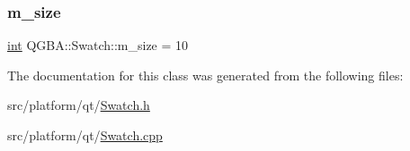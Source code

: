 \subsubsection{\texorpdfstring{m\+\_\+size}{m\_size}}
{\footnotesize\ttfamily \mbox{\hyperlink{ioapi_8h_a787fa3cf048117ba7123753c1e74fcd6}{int}} Q\+G\+B\+A\+::\+Swatch\+::m\+\_\+size = 10\hspace{0.3cm}{\ttfamily [private]}}



The documentation for this class was generated from the following files\+:\begin{DoxyCompactItemize}
\item 
src/platform/qt/\mbox{\hyperlink{_swatch_8h}{Swatch.\+h}}\item 
src/platform/qt/\mbox{\hyperlink{_swatch_8cpp}{Swatch.\+cpp}}\end{DoxyCompactItemize}
